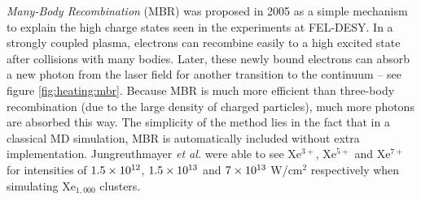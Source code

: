 \textit{Many-Body Recombination} (MBR) was proposed in 2005\cite{Jungreuthmayer2005}
as a simple mechanism to explain the high charge states seen in the
experiments at FEL-DESY. In a strongly coupled plasma, electrons can recombine
easily to a high excited
state after collisions with many bodies. Later, these newly bound electrons can
absorb a new photon from the laser field for another transition to the
continuum -- see figure \ref{fig:heating:mbr}.
Because MBR is much more efficient than three-body
recombination (due to the large density of charged particles), much more
photons are absorbed this way. The simplicity of the
method lies in the fact that in a classical MD simulation, MBR is automatically
included without extra implementation. Jungreuthmayer \textit{et al.} were able
to see Xe$^{3+}$, Xe$^{5+}$ and Xe$^{7+}$ for intensities of $\ten{1.5}{12}$,
$\ten{1.5}{13}$ and $\ten{7}{13}$ W/cm$^2$ respectively when simulating
Xe$_{1,000}$ clusters.


